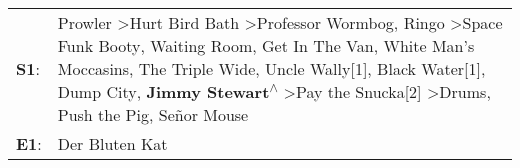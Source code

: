 \begin{supertabular}{p{0.03\textwidth}p{0.92\textwidth}}
 \textbf{S1}:  &  Prowler\textsuperscript{} \textgreater \enspace Hurt Bird Bath\textsuperscript{} \textgreater \enspace Professor Wormbog\textsuperscript{}, \enspace Ringo\textsuperscript{} \textgreater \enspace Space Funk Booty\textsuperscript{}, \enspace Waiting Room\textsuperscript{}, \enspace Get In The Van\textsuperscript{}, \enspace White Man's Moccasins\textsuperscript{}, \enspace The Triple Wide\textsuperscript{}, \enspace Uncle Wally[1]\textsuperscript{}, \enspace Black Water[1]\textsuperscript{}, \enspace Dump City\textsuperscript{}, \enspace \textbf{Jimmy Stewart\textsuperscript{$\wedge$}} \textgreater \enspace Pay the Snucka[2]\textsuperscript{} \textgreater \enspace Drums\textsuperscript{}, \enspace Push the Pig\textsuperscript{}, \enspace Señor Mouse\textsuperscript{}  \enspace  \\
 \textbf{E1}:  &                                                                                                                                                                                                                                                                                                                                                                                                                                                                                                                                                                                                                                                                                                                                                                         Der Bluten Kat\textsuperscript{}  \enspace  \\
\end{supertabular}
